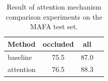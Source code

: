 \documentclass[10pt,twocolumn,letterpaper]{article}
\begin{document}
\begin{table}[htbp]
\begin{center}
\begin{tabular}{|l|c|c|c|}
\hline
Method & occluded & all \\
\hline
baseline & 75.5 & 87.0 \\
attention & 76.5 & 88.3 \\
\hline
\end{tabular}
\end{center}
\caption{Result of attention mechanism comparison experiments on the MAFA test set.}
\label{table: attention_mafa}
\end{table}




\end{document}
